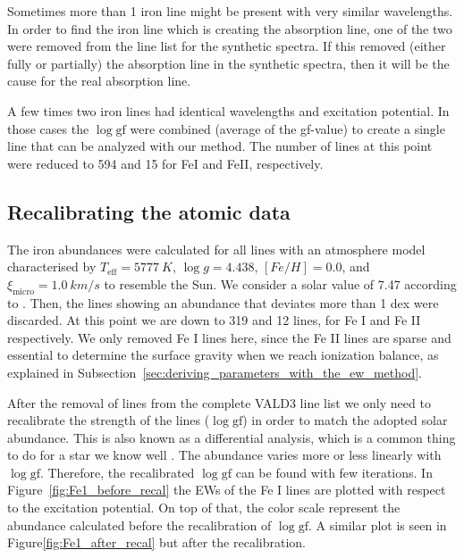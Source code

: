 \documentclass{aa}
\begin{document}
Sometimes more than 1 iron line might be present with very similar
wavelengths. In order to find the iron line which is creating the
absorption line, one of the two were removed from the line list for
the synthetic spectra. If this removed (either fully or partially) the
absorption line in the synthetic spectra, then it will be the cause for
the real absorption line.

A few times two iron lines had identical wavelengths and excitation
potential. In those cases the $\log \mathrm{gf}$ were combined (average
of the gf-value) to create a single line that can be analyzed with our
method. The number of lines at this point were reduced to 594 and 15 for
FeI and FeII, respectively.


\subsection{Recalibrating the atomic data}
\label{ssub:Recalibrating-the-atomic-data}

The iron abundances were calculated for all lines with an atmosphere
model characterised by $T_\mathrm{eff}=\SI{5777}{K}$, $\log g =
4.438$, $[Fe/H] = 0.0$, and $\xi_\mathrm{micro} = \SI{1.0}{km/s}$
to resemble the Sun. We consider a solar value of 7.47 according to
\cite{Gonzales2000}. Then, the lines showing an abundance that deviates
more than 1 dex were discarded. At this point we are down to 319 and
12 lines, for Fe I and Fe II respectively. We only removed Fe I lines
here, since the Fe II lines are sparse and essential to determine the
surface gravity when we reach ionization balance, as explained in
Subsection~\ref{sec:deriving_parameters_with_the_ew_method}.

After the removal of lines from the complete VALD3 line list we only
need to recalibrate the strength of the lines ($\log \mathrm{gf}$) in
order to match the adopted solar abundance. This is also known as a
differential analysis, which is a common thing to do for a star we know
well \citep{Onehag2012}. The abundance varies more or less linearly
with $\log \mathrm{gf}$. Therefore, the recalibrated $\log \mathrm{gf}$
can be found with few iterations. In Figure~\ref{fig:Fe1_before_recal}
the EWs of the Fe I lines are plotted with respect to the excitation
potential. On top of that, the color scale represent the abundance
calculated before the recalibration of $\log \mathrm{gf}$. A similar
plot is seen in Figure\ref{fig:Fe1_after_recal} but after the
recalibration.
\end{document}
